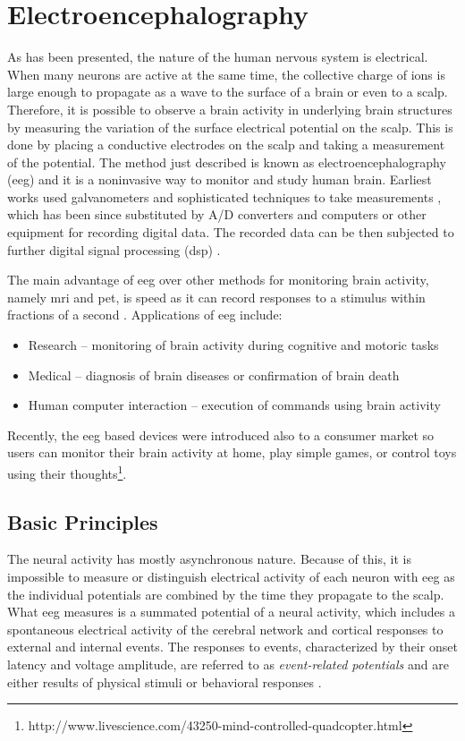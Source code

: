 \section{Electroencephalography}
As has been presented, the nature of the human nervous system is electrical. When many neurons are active at the same time, the collective charge of ions is large enough to propagate as a wave to the surface of a brain or even to a scalp. Therefore, it is possible to observe a brain activity in underlying brain structures by measuring the variation of the surface electrical potential on the scalp. This is done by placing a conductive electrodes on the scalp and taking a measurement of the potential. The method just described is known as electroencephalography (\gls{eeg}) and it is a noninvasive way to monitor and study human brain. Earliest works used galvanometers and sophisticated techniques to take measurements \cite{eegHistory}, which has been since substituted by A/D converters and computers or other equipment for recording digital data. The recorded data can be then subjected to further digital signal processing (\gls{dsp}) \cite{eegClass}.

The main advantage of \gls{eeg} over other methods for monitoring brain activity, namely \gls{mri} and \gls{pet}, is speed as it can record responses
to a stimulus within fractions of a second \cite{eegFund}. Applications of \gls{eeg}
include:
\begin{itemize}
  \item Research -- monitoring of brain activity during cognitive and motoric tasks
  \item Medical -- diagnosis of brain diseases or confirmation of brain death 
  \item Human computer interaction -- execution of commands using brain activity  
\end{itemize}
Recently, the \gls{eeg} based devices were introduced also to a consumer market so users can monitor their brain activity at home, play simple games, or control toys using their thoughts\footnote{http://www.livescience.com/43250-mind-controlled-quadcopter.html}.

\subsection{Basic Principles}
The neural activity has mostly asynchronous nature. Because of this, it is impossible to measure or distinguish electrical activity of each neuron with \gls{eeg} as the individual potentials are combined by the time they propagate to the scalp.
What \gls{eeg} measures is a summated potential of a neural activity, which includes
a spontaneous electrical activity of the cerebral network and cortical responses to
external and internal events. The responses to events, characterized by their
onset latency and voltage amplitude, are referred to as \emph{event-related
potentials} and are either results of physical stimuli or behavioral responses \cite{bcComm}.

